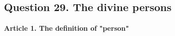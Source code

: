 \documentclass{ucetd}
\begin{document}
\subsection{Question 29. The divine persons}
\paragraph{Article 1. The definition of "person"}
\end{document}

